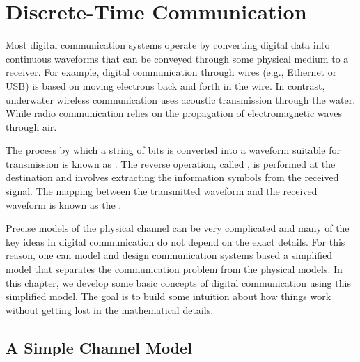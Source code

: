 \chapter{Discrete-Time Communication}
\label{chapter:DiscreteTimeComm}

Most digital communication systems operate by converting digital data into continuous waveforms that can be conveyed through some physical medium to a receiver.
For example, digital communication through wires (e.g., Ethernet or USB) is based on moving electrons back and forth in the wire.
In contrast, underwater wireless communication uses acoustic transmission through the water.
While radio communication relies on the propagation of electromagnetic waves through air.

The process by which a string of bits is converted into a waveform suitable for transmission is known as .
The reverse operation, called , is performed at the destination and involves extracting the information symbols from the received signal.
The mapping between the transmitted waveform and the received waveform is known as the .

Precise models of the physical channel can be very complicated and many of the key ideas in digital communication do not depend on the exact details.
For this reason, one can model and design communication systems based a simplified model that separates the communication problem from the physical models.
In this chapter, we develop some basic concepts of digital communication using this simplified model.
The goal is to build some intuition about how things work without getting lost in the mathematical details.

\section{A Simple Channel Model}

